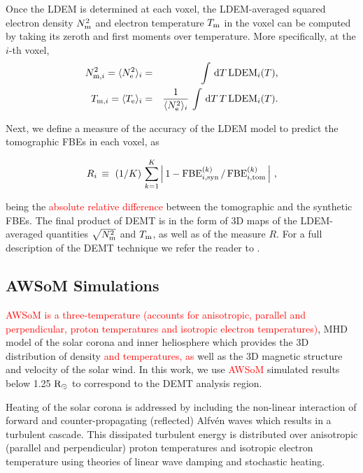 \documentclass[namedreferences]{solarphysics}
\def\edit#1{\textcolor{Red}{#1}}
\newcommand{\mrsun}{{\rm R_\odot}}
\newcommand{\LDEM}{{\rm LDEM}}
\newcommand{\FBE}{{\rm FBE}}
\newcommand{\Te}{T_{\rm e}}
\newcommand{\Tm}{T_{\rm m}}
\newcommand{\Tmi}{T_{{\rm m},i}}
\newcommand{\Ne}{N_{\rm e}}
\newcommand{\Nm}{N_{\rm m}}
\newcommand{\Nsqmi}{N^2_{{\rm m},i}}
\newcommand{\Nsqm}{N^2_{{\rm m}}}
\newcommand{\sqravgN}{\sqrt{\Nsqm}}
\begin{document}
\begin{article}
Once the LDEM is determined at each voxel, {the LDEM-averaged squared electron density $\Nm^2$ and electron temperature $\Tm$} in the voxel can be computed by taking its zeroth and first moments over temperature. More specifically, at the $i$-th voxel,
{
\begin{eqnarray}\label{momento1}
 \Nsqmi = \langle \Ne^2 \rangle_i &=& \int\,\textrm{d}T\,\LDEM_i(T),\label{Ne} \\ 
\label{momento2}
 \Tmi  = \langle \Te \rangle_i &=& \frac{1}{\langle \Ne^2 \rangle_i}\,\int\,\textrm{d}T\,T\,\LDEM_i(T).\label{Tm} 
\end{eqnarray}
}

Next, we define a measure of the accuracy of the LDEM model to predict the tomographic FBEs in each voxel, as

\begin{equation}\label{R}
R_i \, \equiv \ (1/K) \, \sum_{k=1}^K \left| \, 1 - \FBE^{(k)}_{i,\rm syn}\,/\,\FBE^{(k)}_{i,\rm tom}\, \right| \,,
\end{equation}

\noindent 
{being the} \edit{absolute relative difference} between the tomographic and the synthetic FBEs. {The final product of DEMT is in the form of 3D maps of the LDEM-averaged quantities $\sqravgN$ and $\Tm$, as well as of the measure $R$.} {For a full description of the {DEMT technique} we refer the reader to \citet{frazin_2009}.}

\subsection{{AWSoM Simulations}}\label{awsom} 

\edit{AWSoM is a three-temperature (accounts for anisotropic, parallel and perpendicular, proton temperatures and isotropic electron temperatures)}, MHD model of the solar corona and inner heliosphere which provides the 3D distribution of density \edit{and temperatures, as} well as the 3D magnetic structure and velocity of the solar wind. In this work, we use \edit{AWSoM} simulated results below 1.25 $\mrsun$ to correspond to the DEMT analysis region.

{Heating of the solar corona is addressed} by including the non-linear interaction of forward and counter-propagating (reflected) Alfv\'{e}n waves which results in a turbulent cascade. This dissipated turbulent energy is distributed over anisotropic (parallel and perpendicular) proton temperatures and isotropic electron temperature using theories of linear wave damping and stochastic heating.


\end{article}
\end{document}
